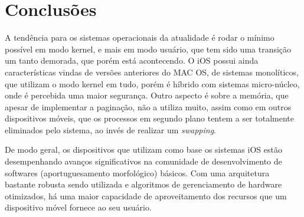 \documentclass[conference]{IEEEtran}
\begin{document}
\section{Conclusões}
A tendência para os sistemas operacionais da atualidade é rodar o mínimo possível em modo kernel, e mais em modo usuário, que tem sido uma transição um tanto demorada, que porém está acontecendo. O iOS possui ainda características vindas de versões anteriores do MAC OS, de sistemas monolíticos, que utilizam o modo kernel em tudo, porém é híbrido com sistemas micro-núcleo, onde é percebida uma maior segurança. Outro aspecto é sobre a memória, que apesar de implementar a paginação, não a utiliza muito, assim como em outros dispositivos móveis, que os processos em segundo plano tentem a ser totalmente eliminados pelo sistema, ao invés de realizar um \textit{swapping}.

De modo geral, os dispositivos que utilizam como base os sistemas iOS estão desempenhando avanços significativos na comunidade de desenvolvimento de softwares (aportuguesamento morfológico) básicos. Com uma arquitetura bastante robusta sendo utilizada e algoritmos de gerenciamento de hardware otimizados, há uma maior capacidade de aproveitamento dos recursos que um dispositivo móvel fornece ao seu usuário.
\end{document}
